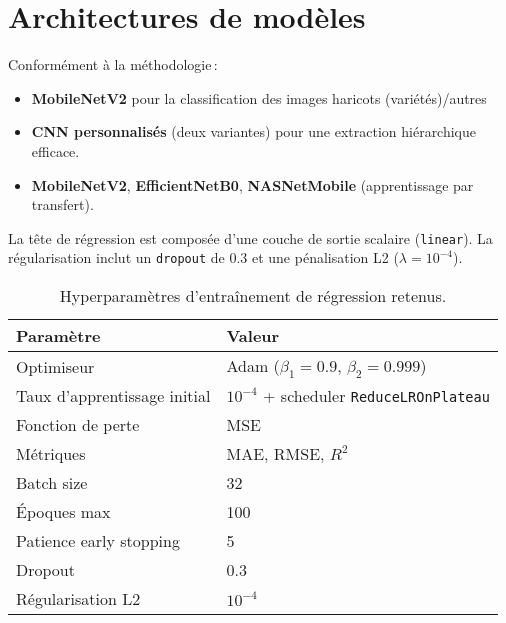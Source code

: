 \section{Architectures de modèles}
\label{sec:modeles}

Conformément à la méthodologie :


\begin{itemize}
	\item  \textbf{MobileNetV2} pour la classification des images haricots (variétés)/autres
	\item \textbf{CNN personnalisés} (deux variantes) pour une extraction hiérarchique efficace.
	\item \textbf{MobileNetV2}, \textbf{EfficientNetB0}, \textbf{NASNetMobile} (apprentissage par transfert).
\end{itemize}

La tête de régression est composée d’une couche de sortie scalaire (\texttt{linear}).
La régularisation inclut un \texttt{dropout} de 0.3 et une pénalisation L2 (\(\lambda=10^{-4}\)).

\begin{table}[h!]
	\centering
	\caption{Hyperparamètres d’entraînement de régression retenus.}
	\label{tab:hyperparams}
	\begin{tabular}{l l}
		\toprule
		Paramètre                    & Valeur                                             \\ \midrule
		Optimiseur                   & Adam (\(\beta_1=0.9\), \(\beta_2=0.999\))          \\
		Taux d’apprentissage initial & \(10^{-4}\) + scheduler \texttt{ReduceLROnPlateau} \\
		Fonction de perte            & MSE                                                \\
		Métriques                    & MAE, RMSE, \(R^2\)                                 \\
		Batch size                   & 32                                                 \\
		Époques max                  & 100                                                \\
		Patience early stopping      & 5                                                  \\
		Dropout                      & 0.3                                                \\
		Régularisation L2            & \(10^{-4}\)                                        \\ \bottomrule
	\end{tabular}
\end{table}

